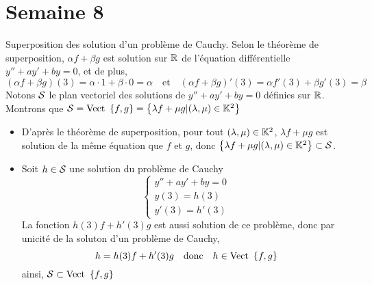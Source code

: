 \documentclass{article}
\renewenvironment{question_kholle}[2][ ]
{
	\subsection{\texorpdfstring{#2}{}}
	\notblank{#1}
	{
		\noindent #1
		\bigbreak
	}
	{}
	\begin{proof}
}
{
	\end{proof}
}
\begin{document}
\pagebreak\section{Semaine 8}

\begin{question_kholle}[{
				Soient $(a,b)\in\C$, $f$ et $g$ les solutions, définies sur $\R$ à valeur dans $\C$ des problèmes de Cauchy suivants
				\[
					\begin{cases}
						y''+ay'+by = 0 \\
						y(3)=1         \\
						y'(3)=0
					\end{cases} \quad \text{et} \quad \begin{cases}
						y''+ay'+by = 0 \\
						y(3)=0         \\
						y'(3)=1
					\end{cases}
				\]
				Comment s’exprime la solution définie sur $\R$ de $\begin{cases}
						y''+ay'+by=0 \\
						y(3)=\alpha  \\
						y'(3)=\beta
					\end{cases}$ pour $(\alpha, \beta)\in\R^{2}$ fixés ?\\
				Peut-on affirmer que le plan vectoriel des solutions définies sur $\R$ à valeur dans $\C$ de l’équation $y''+ay'+by=0$ est $\left\{\lambda\cdot f+\mu\cdot g | (\lambda, \mu)\in\C^{2}\right\}$ ?
			}]{Superposition des solution d’un problème de Cauchy.}
	Selon le théorème de superposition, $\alpha f+\beta g$ est solution sur $\R$ de l'équation différentielle $y''+ay'+by=0$, et de plus,
	\[
		(\alpha f+\beta g)(3) = \alpha\cdot 1+\beta\cdot 0 = \alpha \quad \text{et} \quad (\alpha f+\beta g)'(3) = \alpha f'(3)+\beta g'(3)=\beta
	\]
	Notons $\mathcal S$ le plan vectoriel des solutions de $y''+ay'+by=0$ définies sur $\R$.\\
	Montrons que $\mathcal S=\text{Vect } \left\{f,g\right\} = \left\{\lambda f+ \mu g | (\lambda, \mu)\in\mathbb K^{2}\right\}$
	\begin{itemize}
		\item D’après le théorème de superposition, pour tout $(\lambda, \mu)\in\mathbb K^{2}$, $\lambda f + \mu g$ est solution de la même équation que $f$ et $g$, donc $\left\{\lambda f+\mu g| (\lambda, \mu)\in\mathbb K^{2}\right\}\subset\mathcal S$.
		\item Soit $h\in\mathcal S$ une solution du problème de Cauchy
		      \[
			      \begin{cases}
				      y''+ay'+by = 0 \\
				      y(3)=h(3)      \\
				      y'(3)=h'(3)
			      \end{cases}
		      \]
		      La fonction $h(3)f+h'(3)g$ est aussi solution de ce problème, donc par unicité de la soluton d’un problème de Cauchy,
		      \[
			      h = h(3)f+h'(3)g \quad \text{donc} \quad h\in\text{Vect } \left\{f,g\right\}
		      \]
		      ainsi, $\mathcal S\subset\text{Vect } \left\{f,g\right\}$
	\end{itemize}

\end{question_kholle}
\end{document}
